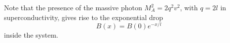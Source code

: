 \documentclass[../../Main/Main.tex]{subfiles}
\begin{document}
\begin{figure}[H]
\begin{minipage}[c]{0.5\linewidth}
\end{minipage}
\begin{minipage}[]{0.5\linewidth}
\centering
{}
\end{minipage}
\caption{\label{fig:} }
\end{figure}


\begin{remark}
Note that the  presence of the massive photon \( M^2_A = 2 q^2 v^2 \), with \( q = 2 l \) in superconductivity, gives rise to the exponential drop
\begin{equation*}
  B (x) = B(0) e^ {- x/l}
\end{equation*}
inside the system.
\end{remark}
\end{document}
